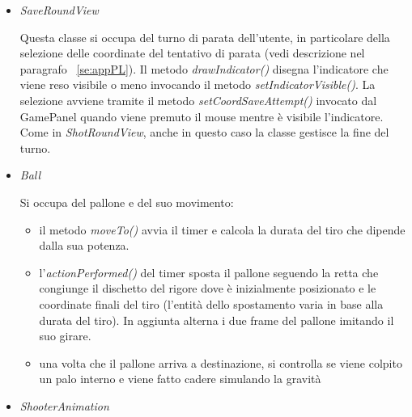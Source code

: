 \documentclass[12pt,a4paper]{report}
\begin{document}
\begin{itemize}
Questa classe si occupa del turno di tiro dell'utente, in particolare della selezione della direzione, altezza e potenza del tiro (vedi descrizione nel paragrafo ~\ref{se:appPL}). Il metodo \emph{drawSelectors()} disegna i selettori che vengono spostati dall'\emph{actionPerformed()} ad ogni evento del timer.
La selezione avviene tramite i metodi \emph{setDirection()}, \emph{setHeight()} e \emph{setPower()}, invocati dal GamePanel alla pressione del mouse.
Inoltre gestisce la fine del turno: invoca i metodi del Logic per stabilire se si segna, riproduce i vari suoni, aggiorna il tabellino, muove la rete richiamando il metodo \emph{moveNet()} di GamePanel in caso di gol ed effettua il reset dei vari componenti ed il cambio di turno, controllando se una delle due squadre ha vinto la partita.

\item\emph{SaveRoundView}

Questa classe si occupa del turno di parata dell'utente, in particolare della selezione delle coordinate del tentativo di parata (vedi descrizione nel paragrafo ~\ref{se:appPL}). Il metodo \emph{drawIndicator()} disegna l'indicatore che viene reso visibile o meno invocando il metodo \emph{setIndicatorVisible()}.
La selezione avviene tramite il metodo \emph{setCoordSaveAttempt()} invocato dal GamePanel quando viene premuto il mouse mentre è visibile l'indicatore.
Come in \emph{ShotRoundView}, anche in questo caso la classe gestisce la fine del turno.

\item\emph{Ball}

Si occupa del pallone e del suo movimento: 
\begin{itemize}
    \item
    il metodo \emph{moveTo()} avvia il timer e calcola la durata del tiro che dipende dalla sua potenza.
    \item
    l'\emph{actionPerformed()} del timer sposta il pallone seguendo la retta che congiunge il dischetto del rigore dove è inizialmente posizionato e le coordinate finali del tiro (l'entità dello spostamento varia in base alla durata del tiro). In aggiunta alterna i due frame del pallone imitando il suo girare.
    \item
    una volta che il pallone arriva a destinazione, si controlla se viene colpito un palo interno e viene fatto cadere simulando la gravità
\end{itemize}

\item\emph{ShooterAnimation}


\end{itemize}
\end{document}
